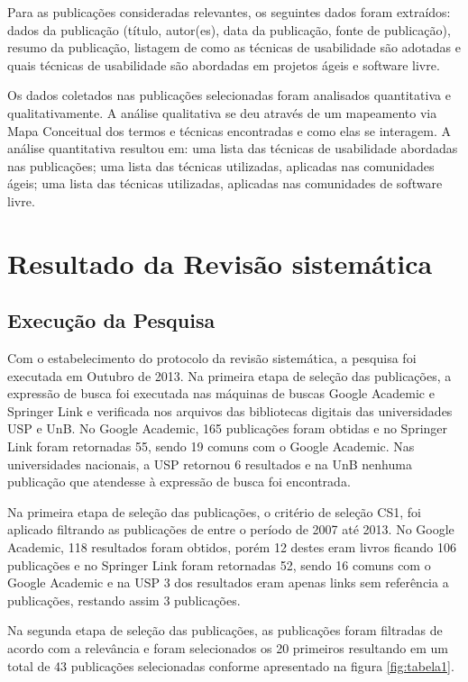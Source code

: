 \documentclass[12pt]{article}
\begin{document}
%
Para as publicações consideradas relevantes, os seguintes dados foram extraídos: dados da publicação (título, autor(es), data da publicação, fonte de publicação), resumo da publicação, listagem de como as técnicas de usabilidade são adotadas e quais técnicas de usabilidade são abordadas em projetos ágeis e software livre.

%
Os dados coletados nas publicações selecionadas foram analisados quantitativa e qualitativamente. A análise qualitativa se deu através de um mapeamento via Mapa Conceitual dos termos e técnicas encontradas e como elas se interagem. A análise quantitativa resultou em: uma lista das técnicas de usabilidade abordadas nas publicações; uma lista das técnicas utilizadas, aplicadas nas comunidades ágeis; uma lista das técnicas utilizadas, aplicadas nas comunidades de software livre.

\section{Resultado da Revisão sistemática}
\label{sec:result_rev_sis}
\subsection{Execução da Pesquisa}

Com o estabelecimento do protocolo da revisão sistemática, a pesquisa foi executada em Outubro de 2013. Na primeira etapa de seleção das publicações, a expressão de busca foi executada nas máquinas de buscas Google Academic e Springer Link e verificada nos  arquivos  das bibliotecas digitais das universidades USP e UnB. No Google Academic, 165 publicações foram obtidas e no Springer Link foram retornadas 55, sendo 19 comuns com o Google Academic. Nas universidades nacionais, a USP retornou 6 resultados e na UnB nenhuma publicação que atendesse à expressão de busca foi encontrada.

%
Na primeira etapa de seleção das publicações, o critério de seleção CS1, foi aplicado filtrando as publicações de entre o período de 2007 até 2013. No Google Academic, 118 resultados foram obtidos, porém 12 destes eram livros ficando 106 publicações e no Springer Link foram retornadas 52, sendo 16 comuns com o Google Academic e na USP 3 dos resultados eram apenas links sem referência a publicações, restando assim 3 publicações.

%
Na segunda etapa de seleção das publicações, as publicações foram filtradas de acordo com a relevância e foram selecionados os 20 primeiros resultando em um total de 43 publicações selecionadas conforme apresentado na figura \ref{fig:tabela1}.
\end{document}

